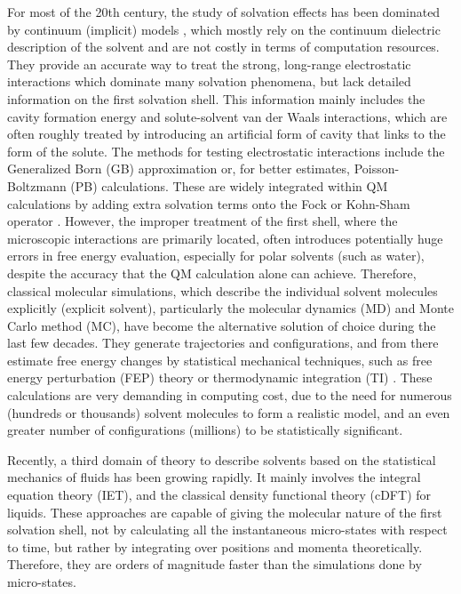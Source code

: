 For most of the 20th century, the study of solvation effects has been
dominated by continuum (implicit) models \citep{Jensen,Cramer_1999},
which mostly rely on the continuum dielectric description of the solvent
and are not costly in terms of computation resources. They provide
an accurate way to treat the strong, long-range electrostatic interactions
which dominate many solvation phenomena, but lack detailed information
on the first solvation shell. This information mainly includes the
cavity formation energy and solute-solvent van der Waals interactions,
which are often roughly treated by introducing an artificial form of
cavity that links to the form of the solute. The methods for testing electrostatic
interactions include the Generalized Born (GB) approximation or, for
better estimates, Poisson-Boltzmann (PB) calculations. These are widely
integrated within \acs{QM} calculations by adding extra solvation
terms onto the Fock or Kohn-Sham operator \citep{Tomasi_1994_implicit_model,tomasi_quantum_2005}.
However, the improper treatment of the first shell, where the microscopic
interactions are primarily located, often introduces potentially huge
errors in free energy evaluation, especially for polar solvents (such
as water), despite the accuracy that the \acs{QM} calculation alone
can achieve. Therefore, classical molecular simulations, which describe
the individual solvent molecules explicitly (explicit solvent), particularly
the molecular dynamics (\acs{MD}) and Monte Carlo method (\acs{MC}),
have become the alternative solution of choice during the last few decades.
They generate trajectories and configurations, and from there estimate
free energy changes by statistical mechanical techniques, such as
free energy perturbation (FEP) theory or thermodynamic integration
(TI) \citep{Jorgensen_1995_MC}. These calculations are very demanding
in computing cost, due to the need for numerous (hundreds or thousands)
solvent molecules to form a realistic model, and an even greater number of configurations
(millions) to be statistically significant.

Recently, a third domain of theory to describe solvents based on the
statistical mechanics of fluids has been growing rapidly. It mainly
involves the integral equation theory (\acs{IET}), and the classical
density functional theory (c\acs{DFT}) for liquids. These approaches
are capable of giving the molecular nature of the first solvation
shell, not by calculating all the instantaneous micro-states
with respect to time, but rather by integrating over positions and
momenta theoretically. Therefore, they are orders of magnitude
faster than the simulations done by micro-states.

